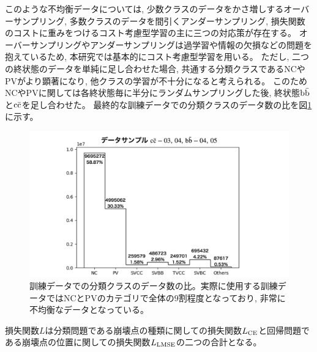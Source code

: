 このような不均衡データについては, 少数クラスのデータをかさ増しするオーバーサンプリング, 多数クラスのデータを間引くアンダーサンプリング, 損失関数のコストに重みをつけるコスト考慮型学習の主に三つの対応策が存在する。
オーバーサンプリングやアンダーサンプリングは過学習や情報の欠損などの問題を抱えているため, 本研究では基本的にコスト考慮型学習を用いる。
ただし, 二つの終状態のデータを単純に足し合わせた場合, 共通する分類クラスであるNCやPVがより顕著になり, 他クラスの学習が不十分になると考えられる。
このためNCやPVに関しては各終状態毎に半分にランダムサンプリングした後, 終状態$\rm b\bar{b}$と$\rm c\bar{c}$を足し合わせた。
最終的な訓練データでの分類クラスのデータ数の比を図\ref{3-3-2-2ImbalancedData}に示す。

\begin{figure}[htbp]
 \centering
 \includegraphics[width=1.0\textwidth]{Figure/3Networks/3-3-2-2ImbalancedData.png}
 \caption[訓練データでの分類クラスのデータ数の比]{訓練データでの分類クラスのデータ数の比。実際に使用する訓練データではNCとPVのカテゴリで全体の$9$割程度となっており, 非常に不均衡なデータとなっている。}
 \label{3-3-2-2ImbalancedData}
\end{figure}

損失関数$L$は分類問題である崩壊点の種類に関しての損失関数$L_{\rm CE}$と回帰問題である崩壊点の位置に関しての損失関数$L_{\rm LMSE}$の二つの合計となる。

